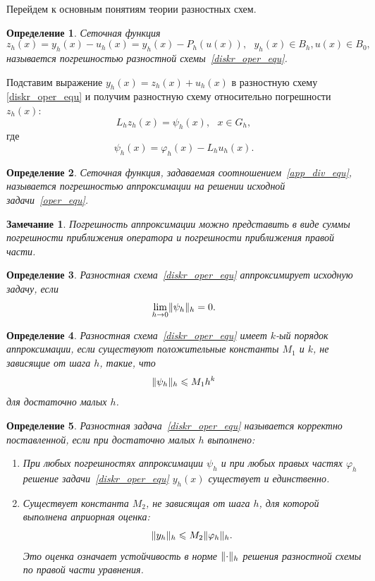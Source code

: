 \documentclass[11pt,a4paper,twoside,listtotoc,bibtotoc]{report}
\numberwithin{equation}{section}
\newtheorem*{definition}{Определение}
\theoremstyle{definition}
\theoremstyle{plain}
\newtheorem*{note*}{Замечание}
\DeclarePairedDelimiter\norm{\lVert}{\rVert}
\begin{document}
Перейдем к основным понятиям теории разностных схем.
%
\begin{definition}
%
    Сеточная функция
    \begin{equation}
        \label{approx_sc}
        z_h(x)=y_h(x)-u_h(x)=y_h(x)-P_h(u(x)),~~~y_h(x) \in B_h, u(x) \in B_0,
    \end{equation}
    называется погрешностью разностной схемы~\eqref{diskr_oper_equ}.
%
\end{definition}
Подставим выражение $y_h(x)=z_h(x)+u_h(x)$ в разностную схему
\eqref{diskr_oper_equ} и получим разностную
схему относительно погрешности $z_h(x)$:
%
\begin{equation}
%
    \label{div_equ}
    L_hz_h(x)=\psi_h(x),~~~x\in G_h,
%
\end{equation}
%
где
%
\begin{equation}
%
    \label{app_div_equ}
    \psi_h(x)= \varphi_h(x)-L_hu_h(x).
%
\end{equation}
%
\begin{definition}
%
    Сеточная функция, задаваемая соотношением~\eqref{app_div_equ}, называется
    погрешностью аппроксимации на решении исходной задачи~\eqref{oper_equ}.
%
\end{definition}
%
\begin{note*}
%
    Погрешность аппроксимации можно представить в виде суммы погрешности приближения
    оператора и погрешности приближения правой части.
%
\end{note*}
%
\begin{definition}
%
    Разностная схема~\eqref{diskr_oper_equ} аппроксимирует исходную задачу, если
    $$
        \lim_{h\rightarrow0}\norm{\psi_h}_h=0.
    $$
%
\end{definition}
%
%
\begin{definition}
%
    Разностная схема~\eqref{diskr_oper_equ} имеет $k$-ый порядок аппроксимации,
    если существуют положительные константы $M_1$ и $k$, не зависящие от шага $h$,
    такие, что
    $$
        \norm{\psi_h}_h \leqslant M_1h^k
    $$
    для достаточно малых $h$.
%
\end{definition}
%
%
\begin{definition}
%
    Разностная задача~\eqref{diskr_oper_equ} называется корректно поставленной, если при
    достаточно малых $h$ выполнено:
    \begin{enumerate}
        \item
            При любых погрешностях аппроксимации $\psi_h$ и при любых правых
            частях $\varphi_h$ решение задачи~\eqref{diskr_oper_equ}
            $y_h(x)$ существует и единственно.
        \item
            Существует константа $M_2$, не зависящая от шага $h$, для которой
            выполнена априорная оценка:
            $$
                \norm{y_h}_h \leqslant M_2\norm{\varphi_h}_h.
            $$
            Это оценка означает устойчивость в норме $\norm{\cdot}_h$ решения разностной схемы
            по правой части уравнения.
    \end{enumerate}
%
\end{definition}
\end{document}
